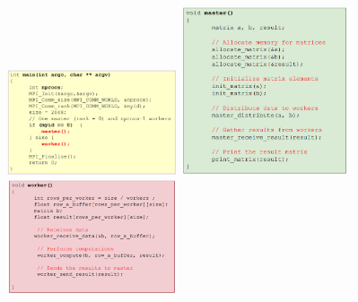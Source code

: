 \documentclass[10pt, landscape]{article}
\begin{document}
\begin{multicols}{4}
\includegraphics*[width=5cm]{main.png}
\includegraphics*[width=5cm]{master}
\includegraphics*[width=5cm]{worker}



\end{multicols}
\end{document}
